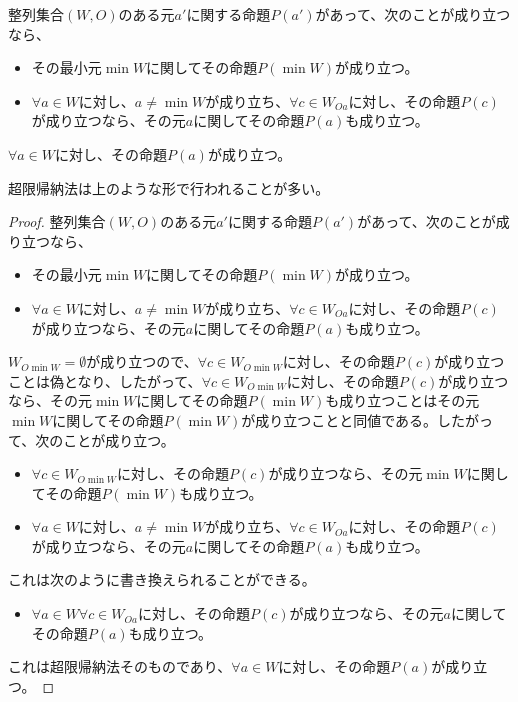 \documentclass[dvipdfmx]{jsarticle}
\begin{document}
\begin{thm}\label{1.3.2.10}
整列集合$(W,O)$のある元$a'$に関する命題$P\left( a' \right)$があって、次のことが成り立つなら、
\begin{itemize}
\item
  その最小元$\min W$に関してその命題$P\left( \min W \right)$が成り立つ。
\item
  $\forall a \in W$に対し、$a \neq \min W$が成り立ち、$\forall c \in W_{Oa}$に対し、その命題$P(c)$が成り立つなら、その元$a$に関してその命題$P(a)$も成り立つ。
\end{itemize}
$\forall a \in W$に対し、その命題$P(a)$が成り立つ。
\end{thm}\par
超限帰納法は上のような形で行われることが多い。
\begin{proof}
整列集合$(W,O)$のある元$a'$に関する命題$P\left( a' \right)$があって、次のことが成り立つなら、
\begin{itemize}
\item
  その最小元$\min W$に関してその命題$P\left( \min W \right)$が成り立つ。
\item
  $\forall a \in W$に対し、$a \neq \min W$が成り立ち、$\forall c \in W_{Oa}$に対し、その命題$P(c)$が成り立つなら、その元$a$に関してその命題$P(a)$も成り立つ。
\end{itemize}
$W_{O\min W} = \emptyset $が成り立つので、$\forall c \in W_{O\min W}$に対し、その命題$P(c)$が成り立つことは偽となり、したがって、$\forall c \in W_{O\min W}$に対し、その命題$P(c)$が成り立つなら、その元$\min W$に関してその命題$P\left( \min W \right)$も成り立つことはその元$\min W$に関してその命題$P\left( \min W \right)$が成り立つことと同値である。したがって、次のことが成り立つ。
\begin{itemize}
\item
  $\forall c \in W_{O\min W}$に対し、その命題$P(c)$が成り立つなら、その元$\min W$に関してその命題$P\left( \min W \right)$も成り立つ。
\item
  $\forall a \in W$に対し、$a \neq \min W$が成り立ち、$\forall c \in W_{Oa}$に対し、その命題$P(c)$が成り立つなら、その元$a$に関してその命題$P(a)$も成り立つ。
\end{itemize}
これは次のように書き換えられることができる。
\begin{itemize}
\item
  $\forall a \in W\forall c \in W_{Oa}$に対し、その命題$P(c)$が成り立つなら、その元$a$に関してその命題$P(a)$も成り立つ。
\end{itemize}
これは超限帰納法そのものであり、$\forall a \in W$に対し、その命題$P(a)$が成り立つ。
\end{proof}
\end{document}
